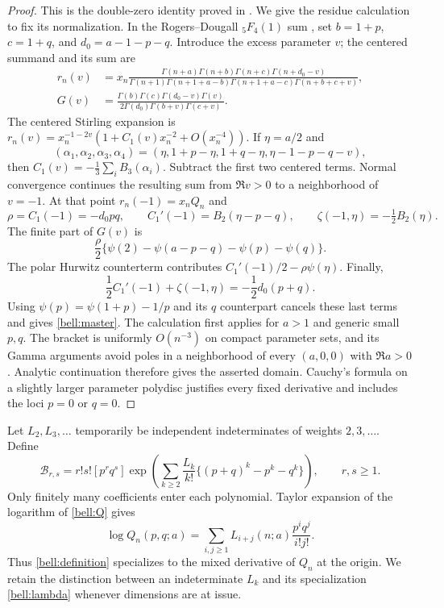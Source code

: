 \begin{proof}
This is the double-zero identity proved in \cite{RepoMixed}. We give
the residue calculation to fix its normalization. In the Rogers--Dougall
${}_5F_4(1)$ sum \cite[16.4.9]{DLMFDougall}, set
$b=1+p$, $c=1+q$, and $d_0=a-1-p-q$. Introduce the excess parameter $v$;
the centered summand and its sum are
\begin{align*}
 r_n(v)&=x_n\frac{\Gamma(n+a)\Gamma(n+b)\Gamma(n+c)
                           \Gamma(n+d_0-v)}
 {\Gamma(n+1)\Gamma(n+1+a-b)\Gamma(n+1+a-c)
                           \Gamma(n+b+c+v)},\\
 G(v)&=\frac{\Gamma(b)\Gamma(c)\Gamma(d_0-v)\Gamma(v)}
 {2\Gamma(d_0)\Gamma(b+v)\Gamma(c+v)}.
\end{align*}
The centered Stirling expansion \cite{DLMFGammaAsymptotic} is
$r_n(v)=x_n^{-1-2v}(1+C_1(v)x_n^{-2}+O(x_n^{-4}))$.
If $\eta=a/2$ and
\[
 (\alpha_1,\alpha_2,\alpha_3,\alpha_4)
 =(\eta,1+p-\eta,1+q-\eta,\eta-1-p-q-v),
\]
then $C_1(v)=-\tfrac13\sum_i B_3(\alpha_i)$.
Subtract the first two centered terms. Normal convergence continues
the resulting sum from $\Re v>0$ to a neighborhood of $v=-1$.
At that point $r_n(-1)=x_nQ_n$ and
\[
 \rho=C_1(-1)=-d_0pq,\qquad
 C_1'(-1)=B_2(\eta-p-q),\qquad
 \zeta(-1,\eta)=-\tfrac12B_2(\eta).
\]
The finite part of $G(v)$ is
\[
 \frac\rho2\{\psi(2)-\psi(a-p-q)-\psi(p)-\psi(q)\}.
\]
The polar Hurwitz counterterm contributes
$C_1'(-1)/2-\rho\psi(\eta)$. Finally,
\[
 \frac12C_1'(-1)+\zeta(-1,\eta)
                  =-\frac12d_0(p+q).
\]
Using $\psi(p)=\psi(1+p)-1/p$ and its $q$ counterpart cancels
these last terms and gives \eqref{bell:master}.
The calculation first applies for $a>1$ and generic small $p,q$.
The bracket is uniformly $O(n^{-3})$ on compact parameter sets, and its
Gamma arguments avoid poles in a neighborhood of every $(a,0,0)$
with $\Re a>0$. Analytic continuation therefore gives the asserted
domain. Cauchy's formula on a slightly larger parameter polydisc
justifies every fixed derivative and includes the loci $p=0$ or $q=0$.
\end{proof}

Let $L_2,L_3,\ldots$ temporarily be independent indeterminates of
weights $2,3,\ldots$. Define
\begin{equation}
 \mathcal B_{r,s}
 =r!s![p^rq^s]\exp\left(
  \sum_{k\ge2}\frac{L_k}{k!}\{(p+q)^k-p^k-q^k\}\right),
 \qquad r,s\ge1.
 \label{bell:definition}
\end{equation}
Only finitely many coefficients enter each polynomial. Taylor expansion
of the logarithm of \eqref{bell:Q} gives
\[
 \log Q_n(p,q;a)
 =\sum_{i,j\ge1}L_{i+j}(n;a)\frac{p^iq^j}{i!j!}.
\]
Thus \eqref{bell:definition} specializes to the mixed derivative of
$Q_n$ at the origin. We retain the distinction between an indeterminate
$L_k$ and its specialization \eqref{bell:lambda} whenever dimensions
are at issue.

